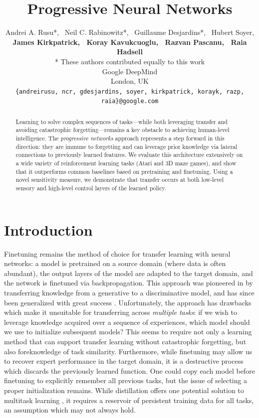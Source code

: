 \documentclass{article}
\title{Progressive Neural Networks}
\author{Andrei A. Rusu*, \ Neil C. Rabinowitz*, \ Guillaume Desjardins*, \ Hubert Soyer,\\
\textbf{James Kirkpatrick, \ Koray Kavukcuoglu, \ Razvan Pascanu, \ Raia Hadsell} \\
\small{* These authors contributed equally to this work}
\vspace{0.15 cm}
\\
Google DeepMind \\
London, UK
\vspace{0.15 cm}
\\
\small\texttt{\{andreirusu, ncr, gdesjardins, soyer, kirkpatrick, korayk, razp, raia\}@google.com} \\
}
\begin{document}

\maketitle

\begin{abstract}
Learning to solve complex sequences of tasks---while both leveraging transfer and
avoiding catastrophic forgetting---remains a key obstacle to achieving human-level
intelligence. The \emph{progressive networks} approach represents a step forward in this direction:
they are immune to forgetting and can leverage prior knowledge via lateral
connections to previously learned features. We evaluate this architecture
extensively on a wide variety of reinforcement learning tasks (Atari and 3D
maze games), and show that it outperforms common baselines based on pretraining
and finetuning. Using a novel sensitivity measure, we demonstrate
that transfer occurs at both low-level sensory and high-level control layers of the learned policy.
\end{abstract}


\section{Introduction}

Finetuning remains the method of choice for transfer learning with neural
networks: a model is pretrained on a source domain (where data is often
abundant), the output layers of the model are adapted to the target domain, and the
network is finetuned via backpropagation. This approach was
pioneered in \cite{hinton2006science} by transferring knowledge from a
generative to a discriminative model, and has since been generalized
with great success \cite{UTLC+LISA-2011}.  Unfortunately, the approach has drawbacks
which make it unsuitable for transferring across \textit{multiple tasks}: if we
wish to leverage knowledge acquired over a sequence of experiences, which model
should we use to initialize subsequent models? This seems to require not only a
learning method that can support transfer learning without catastrophic forgetting, but also
foreknowledge of task similarity. Furthermore, while finetuning may allow us to
recover expert performance in the target domain, it is a destructive process
which discards the previously learned function. One could copy each model before
finetuning to explicitly remember all previous tasks, but the issue of
selecting a proper initialization remains.  While distillation
\cite{Hinton2015distil} offers one potential solution to multitask learning
\cite{Rusu15}, it requires a reservoir of persistent training data for all tasks,
an assumption which may not always hold.
\end{document}
